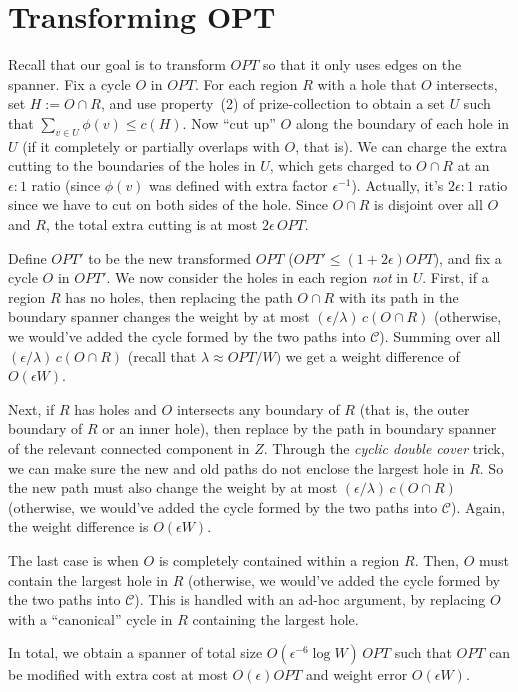 \documentclass{article}
\begin{document}
\section{Transforming OPT}
Recall that our goal is to transform $OPT$ so that it only uses edges on the spanner. Fix a cycle $O$ in $OPT$. For each region $R$ with a hole that $O$ intersects, set $H:=O\cap R$, and use property~(2) of prize-collection to obtain a set $U$ such that $\sum_{v\in U}\phi(v)\le c(H)$. Now ``cut up'' $O$ along the boundary of each hole in $U$ (if it completely or partially overlaps with $O$, that is). We can charge the extra cutting to the boundaries of the holes in $U$, which gets charged to $O\cap R$ at an $\epsilon:1$ ratio (since $\phi(v)$ was defined with extra factor $\epsilon^{-1}$). Actually, it's $2\epsilon:1$ ratio since we have to cut on both sides of the hole. Since $O\cap R$ is disjoint over all $O$ and $R$, the total extra cutting is at most $2\epsilon\,OPT$.

Define $OPT'$ to be the new transformed $OPT$ ($OPT'\le(1+2\epsilon)OPT$), and fix a cycle $O$ in $OPT'$. We now consider the holes in each region \emph{not} in $U$. First, if a region $R$ has no holes, then replacing the path $O\cap R$ with its path in the boundary spanner changes the weight by at most $(\epsilon/\lambda)\, c(O\cap R)$ (otherwise, we would've added the cycle formed by the two paths into $\mathcal C$). Summing over all $(\epsilon/\lambda)\,c(O\cap R)$ (recall that $\lambda\approx OPT/W)$ we get a weight difference of $O(\epsilon W)$.

Next, if $R$ has holes and $O$ intersects any boundary of $R$ (that is, the outer boundary of $R$ or an inner hole), then replace by the path in boundary spanner of the relevant connected component in $Z$. Through the \emph{cyclic double cover} trick, we can make sure the new and old paths do not enclose the largest hole in $R$. So the new path must also change the weight by at most $(\epsilon/\lambda)\,c(O\cap R)$ (otherwise, we would've added the cycle formed by the two paths into $\mathcal C$). Again, the weight difference is $O(\epsilon W)$.

The last case is when $O$ is completely contained within a region $R$. Then, $O$ must contain the largest hole in $R$ (otherwise, we would've added the cycle formed by the two paths into $\mathcal C$). This is handled with an ad-hoc argument, by replacing $O$ with a ``canonical'' cycle in $R$ containing the largest hole.

In total, we obtain a spanner of total size $O(\epsilon^{-6}\log W)\,OPT$ such that $OPT$ can be modified with extra cost at most $O(\epsilon)OPT$ and weight error $O(\epsilon W)$.
\end{document}

